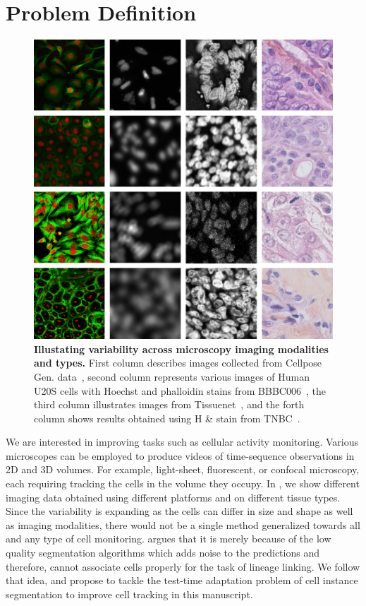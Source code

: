 \section{Problem Definition}
\begin{figure}
    \includegraphics[width=\linewidth]{figs/Modality_Samples_4x4.pdf}
    \caption{\textbf{Illustating variability across microscopy imaging modalities and types.} First column describes images collected from Cellpose Gen. data~\cite{stringer2021cellpose}, second column represents various images of Human U20S cells with Hoechst and phalloidin stains from BBBC006~\cite{ljosa2012annotated}, the third column illustrates images from  Tissuenet~\cite{greenwald2022whole}, and the forth column shows results obtained using H \& stain from TNBC~\cite{naylor2018segmentation}.}
    \label{fig:modality}
\end{figure}


We are interested in improving tasks such as cellular activity monitoring. Various microscopes can be employed to produce videos of time-sequence observations in 2D and 3D volumes. For example, light-sheet, fluorescent, or confocal microscopy, each requiring tracking the cells in the volume they occupy. In , we show different imaging data obtained using different platforms and on different tissue types. Since the variability is expanding as the cells can differ in size and shape as well as imaging modalities, there would not be a single method generalized towards all and any type of cell monitoring. \cite{bragantini2024ultrack} argues that it is merely because of the low quality segmentation algorithms which adds noise to the predictions and therefore, cannot associate cells properly for the task of lineage linking. We follow that idea, and propose to tackle the test-time adaptation problem of cell instance segmentation to improve cell tracking in this manuscript.
 

